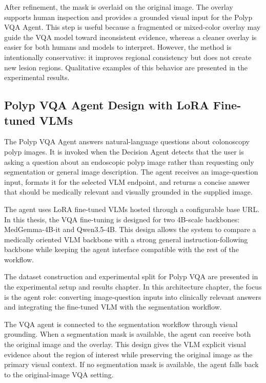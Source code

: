 After refinement, the mask is overlaid on the original image. The overlay supports human inspection and provides a grounded visual input for the Polyp VQA Agent. This step is useful because a fragmented or mixed-color overlay may guide the VQA model toward inconsistent evidence, whereas a cleaner overlay is easier for both humans and models to interpret. However, the method is intentionally conservative: it improves regional consistency but does not create new lesion regions. Qualitative examples of this behavior are presented in the experimental results.

\subsection{Polyp VQA Agent Design with LoRA Fine-tuned VLMs}

The Polyp VQA Agent answers natural-language questions about colonoscopy polyp images. It is invoked when the Decision Agent detects that the user is asking a question about an endoscopic polyp image rather than requesting only segmentation or general image description. The agent receives an image-question input, formats it for the selected VLM endpoint, and returns a concise answer that should be medically relevant and visually grounded in the supplied image.

The agent uses LoRA fine-tuned VLMs hosted through a configurable base URL. In this thesis, the VQA fine-tuning is designed for two 4B-scale backbones: MedGemma-4B-it and Qwen3.5-4B. This design allows the system to compare a medically oriented VLM backbone with a strong general instruction-following backbone while keeping the agent interface compatible with the rest of the workflow.

The dataset construction and experimental split for Polyp VQA are presented in the experimental setup and results chapter. In this architecture chapter, the focus is the agent role: converting image-question inputs into clinically relevant answers and integrating the fine-tuned VLM with the segmentation workflow.

The VQA agent is connected to the segmentation workflow through visual grounding. When a segmentation mask is available, the agent can receive both the original image and the overlay. This design gives the VLM explicit visual evidence about the region of interest while preserving the original image as the primary visual context. If no segmentation mask is available, the agent falls back to the original-image VQA setting.

